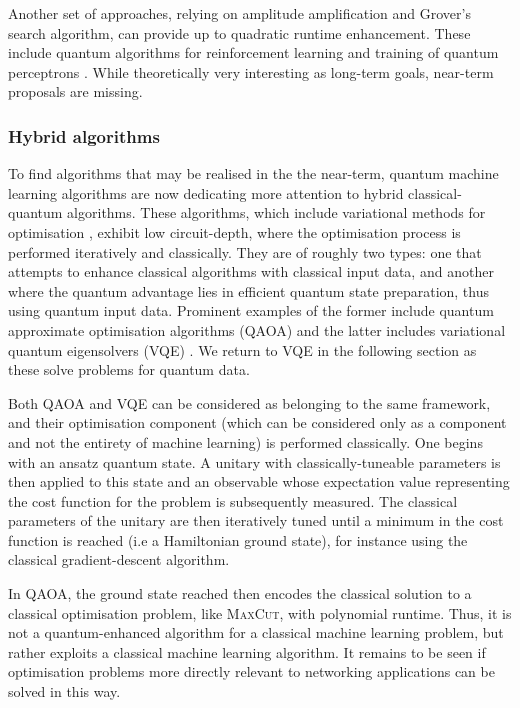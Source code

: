 \documentclass[twocolumn, aps, rmp, amsmath, amssymb, nofootinbib, superscriptaddress, longbibliography, floatfix, table-of-contents, eqsecnum]{revtex4}
\begin{document}
Another set of approaches, relying on amplitude amplification and Grover's search algorithm, can provide up to quadratic runtime enhancement. These include quantum algorithms for reinforcement learning \cite{bib:dunjko2016quantum} and training of quantum perceptrons \cite{bib:kapoor2016quantum}. While theoretically very interesting as long-term goals, near-term proposals are missing.

\subsubsection{Hybrid algorithms}

To find algorithms that may be realised in the the near-term, quantum machine learning algorithms are now dedicating more attention to hybrid classical-quantum algorithms. These algorithms, which include variational methods for optimisation \cite{bib:moll2018quantum}, exhibit low circuit-depth, where the optimisation process is performed iteratively and classically. They are of roughly two types: one that attempts to enhance classical algorithms with classical input data, and another where the quantum advantage lies in efficient quantum state preparation, thus using quantum input data. Prominent examples of the former include quantum approximate optimisation algorithms (QAOA) \cite{bib:farhi2014quantum, bib:farhi2016quantum} and the latter includes variational quantum eigensolvers (VQE) \cite{bib:peruzzo2014peruzzo, bib:kandala2017hardware}. We return to VQE in the following section as these solve problems for quantum data.

Both QAOA and VQE can be considered as belonging to the same framework, and their optimisation component (which can be considered only as a component and not the entirety of machine learning) is performed classically. One begins with an ansatz quantum state. A unitary with classically-tuneable parameters is then applied to this state and an observable whose expectation value representing the cost function for the problem is subsequently measured. The classical parameters of the unitary are then iteratively tuned until a minimum in the cost function is reached (i.e a Hamiltonian ground state), for instance using the classical gradient-descent algorithm.

In QAOA, the ground state reached then encodes the classical solution to a classical optimisation problem, like \textsc{MaxCut}, with polynomial runtime. Thus, it is not a quantum-enhanced algorithm for a classical machine learning problem, but rather exploits a classical machine learning algorithm. It remains to be seen if optimisation problems more directly relevant to networking applications can be solved in this way.
\end{document}
